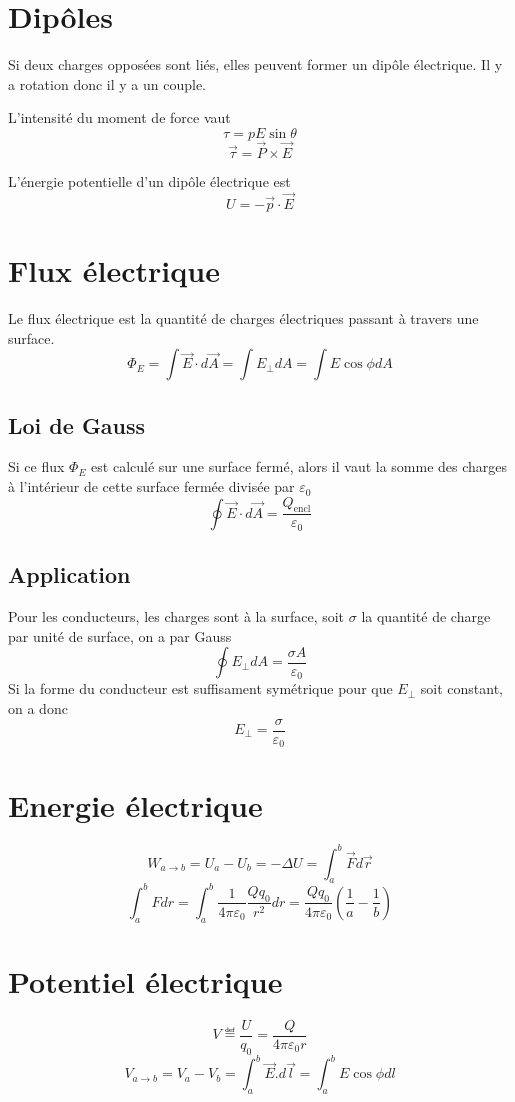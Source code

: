 \section{Dipôles}
Si deux charges opposées sont liés, elles peuvent former un dipôle électrique.
Il y a rotation donc il y a un couple.

L'intensité du moment de force vaut
\[ \tau = pE\sin{\theta} \]
\[ \vec{\tau} = \vec{P} \times \vec{E} \]

L'énergie potentielle d'un dipôle électrique est
\[ U = -\vec{p} \cdot \vec{E} \]

\section{Flux électrique}
Le flux électrique est la quantité de charges électriques passant à travers une surface.
\[ \Phi_E = \int \vec{E} \cdot d\vec{A} = \int E_{\perp} dA = \int E\cos\phi dA \]
\subsection{Loi de Gauss}
Si ce flux $\Phi_E$ est calculé sur une surface fermé, alors il vaut la somme des charges à l'intérieur de cette surface fermée divisée par $\varepsilon_0$
\[ \oint \vec{E} \cdot d\vec{A} = \frac{Q_\mathrm{encl}}{\varepsilon_0} \]
\subsection{Application}
Pour les conducteurs, les charges sont à la surface, soit $\sigma$ la quantité de charge par unité de surface, on a par Gauss
\[ \oint E_\perp dA = \frac{\sigma A}{\varepsilon_0} \]
Si la forme du conducteur est suffisament symétrique pour que $E_\perp$ soit constant, on a donc
\[ E_{\perp} = \frac{\sigma}{\varepsilon_0} \]

\section{Energie électrique}
\[ W_{a\rightarrow b} = U_a - U_b = -\Delta{U} = \int_{a}^{b}\vec{F} d\vec{r} \]
\[ \int_{a}^{b}F dr = \int_{a}^{b}\frac{1}{4\pi\varepsilon_0}\frac{Qq_0}{r^2} dr = \frac{Qq_0}{4\pi\varepsilon_0}\left(\frac{1}{a} - \frac{1}{b}\right) \]

\section{Potentiel électrique}
\[ V \eqdef \frac{U}{q_0} = \frac{Q}{4\pi\varepsilon_0{r}} \]
\[ V_{a \rightarrow b} = V_a - V_b = \int_{a}^{b}\vec{E}.d\vec{l} = \int_{a}^{b}E\cos{\phi} dl \]

